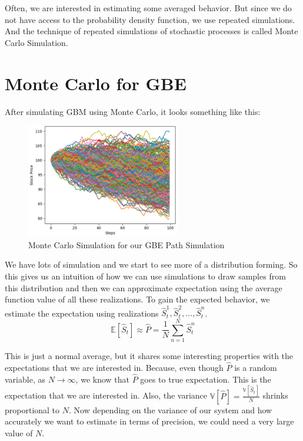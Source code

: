 \documentclass[12pt]{article}
\newcommand{\E}{\mathbb{E}}
\newcommand{\V}{\mathbb{V}}
\begin{document}
Often, we are interested in estimating some averaged behavior. But since we do not have access to the probability density function, we use repeated simulations. And the technique of repeated simulations of stochastic processes is called Monte Carlo Simulation.
 
\clearpage

\section{Monte Carlo for GBE}
After simulating GBM using Monte Carlo, it looks something like this:
\begin{figure}[h!]
\centering
\includegraphics[width=0.6\textwidth]{GBE_MC_Sim.png}
\caption{Monte Carlo Simulation for our GBE Path Simulation}
\end{figure}

We have lots of simulation and we start to see more of a distribution forming. So this gives us an intuition of how we can use simulations to draw samples from this distribution and then we can approximate expectation using the average function value of all these realizations. To gain the expected behavior, we estimate the expectation using realizations $\hat{S}^1_t, \hat{S}^2_t, \ldots , \hat{S}^n_t$.
\begin{equation}
\E [\hat{S}_t] \approx \hat{P} = \frac{1}{N}\sum_{n=1}^{N} \hat{S}^n_t
\end{equation}

This is just a normal average, but it shares some interesting properties  with the  expectations that we are interested in. Because, even though $\hat{P}$ is a random variable, as $N \to \infty$, we know that $\hat{P}$ goes to true expectation. This is the expectation that we are interested in. Also, the variance $\V[\hat{P}] = \frac{\V[\hat{S}_t]}{N}$  shrinks proportional to $N$. Now depending on the variance of our system and how accurately we want to estimate in terms of precision, we could need a very large value of $N$. 
\end{document}
